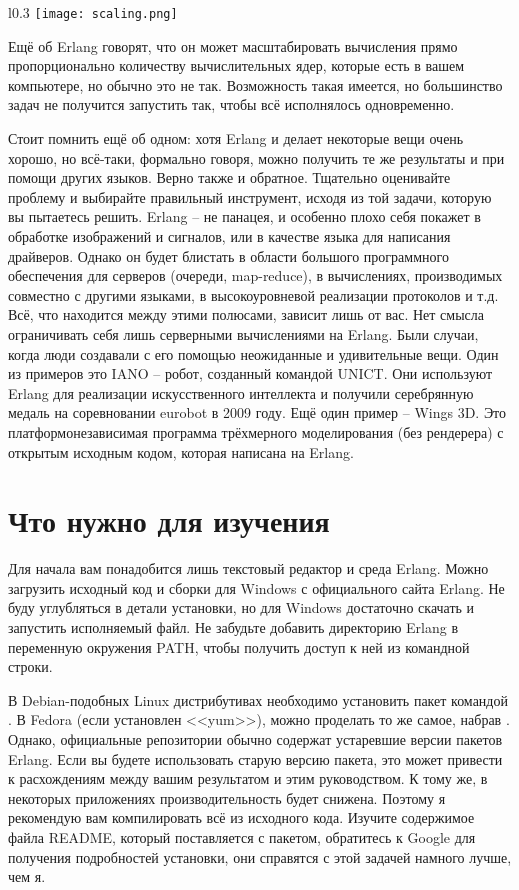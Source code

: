 \begin{wrapfigure}{l}{0.3\linewidth}
    \texttt{[image: scaling.png]}
\end{wrapfigure}
Ещё об Erlang говорят, что он может масштабировать вычисления прямо пропорционально количеству вычислительных ядер, которые есть в вашем компьютере, но обычно это не так.
Возможность такая имеется, но большинство задач не получится запустить так, чтобы всё исполнялось одновременно.

Стоит помнить ещё об одном: хотя Erlang и делает некоторые вещи очень хорошо, но всё\--таки, формально говоря, можно получить те же результаты и при помощи других языков.
Верно также и обратное.
Тщательно оценивайте проблему и выбирайте правильный инструмент, исходя из той задачи, которую вы пытаетесь решить.
Erlang \--- не панацея, и особенно плохо себя покажет в обработке изображений и сигналов, или в качестве языка для написания драйверов.
Однако он будет блистать в области большого программного обеспечения для серверов (очереди, map\--reduce), в вычислениях, производимых совместно с другими языками, в высокоуровневой реализации протоколов и т.д.
Всё, что находится между этими полюсами, зависит лишь от вас.
Нет смысла ограничивать себя лишь серверными вычислениями на Erlang.
Были случаи, когда люди создавали с его помощью неожиданные и удивительные вещи.
Один из примеров это IANO \--- робот, созданный командой UNICT.
Они используют Erlang для реализации искусственного интеллекта и получили серебрянную медаль на соревновании eurobot в 2009 году.
Ещё один пример \--- Wings 3D.
Это платформонезависимая программа трёхмерного моделирования (без рендерера) с открытым исходным кодом, которая написана на Erlang.

\section{Что нужно для изучения}
Для начала вам понадобится лишь текстовый редактор и среда Erlang.
Можно загрузить исходный код и сборки для Windows с официального сайта Erlang.
Не буду углубляться в детали установки, но для Windows достаточно скачать и запустить исполняемый файл.
Не забудьте добавить директорию Erlang в переменную окружения PATH, чтобы получить доступ к ней из командной строки.

В Debian\--подобных Linux дистрибутивах необходимо установить пакет командой .
В Fedora (если установлен <<yum>>), можно проделать то же самое, набрав .
Однако, официальные репозитории обычно содержат устаревшие версии пакетов Erlang.
Если вы будете использовать старую версию пакета, это может привести к расхождениям между вашим результатом и этим руководством.
К тому же, в некоторых приложениях производительность будет снижена.
Поэтому я рекомендую вам компилировать всё из исходного кода.
Изучите содержимое файла README, который поставляется с пакетом, обратитесь к Google для получения подробностей установки, они справятся с этой задачей намного лучше, чем я.


